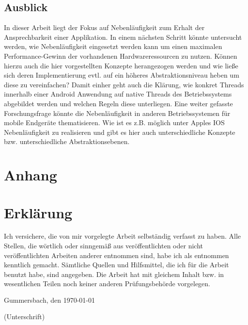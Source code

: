 \documentclass[12pt,oneside,a4paper,bibtotoc,liststotoc]{scrreprt}
\begin{document}
\section{Ausblick}
In dieser Arbeit liegt der Fokus auf Nebenläufigkeit zum Erhalt der Ansprechbarkeit einer Applikation. In einem nächsten Schritt könnte untersucht werden, wie Nebenläufigkeit eingesetzt werden kann um einen maximalen Performance-Gewinn der vorhandenen Hardwareressourcen zu nutzen. Können hierzu auch die hier vorgestellten Konzepte herangezogen werden und wie ließe sich deren Implementierung evtl. auf ein höheres Abstraktionsniveau heben um diese zu vereinfachen? Damit einher geht auch die Klärung, wie konkret Threads innerhalb einer Android Anwendung auf native Threads des Betriebssystems abgebildet werden und welchen Regeln diese unterliegen. Eine weiter gefasste Forschungsfrage könnte die Nebenläufigkeit in anderen Betriebssystemen für mobile Endgeräte thematisieren. Wie ist es z.B. möglich unter Apples IOS Nebenläufigkeit zu realisieren und gibt es hier auch unterschiedliche Konzepte bzw. unterschiedliche Abstraktionsebenen.


\nocite {javaConInPrac, android5, declarativProgrammingScript, declarativCriticalJurnal, nebenlaeufigeProg, funcProgrJava, rxAllgDoku, androidConcurrencyCriticalCompare, rxJavaCaseStudi, rxJavaTutorial, rxInitiative, futureToObservable, rxOnAndroidTips}



\appendix

\chapter*{Anhang}
\chapter{Erklärung}

Ich versichere, die von mir vorgelegte Arbeit selbständig verfasst zu
haben. Alle Stellen, die wörtlich oder sinngemäß aus veröffentlichten
oder nicht veröffentlichten Arbeiten anderer entnommen sind, habe ich
als entnommen kenntlich gemacht. Sämtliche Quellen und Hilfsmittel,
die ich für die Arbeit benutzt habe, sind angegeben. Die Arbeit hat
mit gleichem Inhalt bzw. in wesentlichen Teilen noch keiner anderen
Prüfungsbehörde vorgelegen.

\bigskip

Gummersbach, den \today

\bigskip

\bigskip

\bigskip

\bigskip

\bigskip

\bigskip

(Unterschrift)
\end{document}
